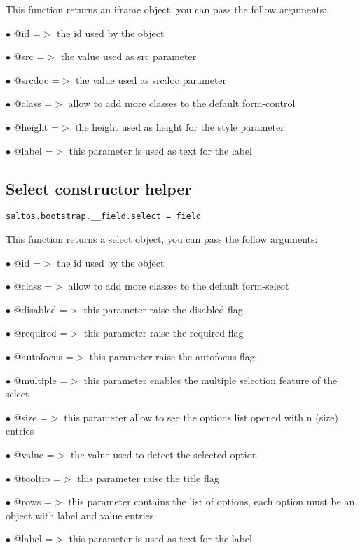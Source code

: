 \documentclass[a4paper]{book}
\begin{document}
This function returns an iframe object, you can pass the follow arguments:

\begin{compactitem}
\item[\color{myblue}$\bullet$] @id     =$>$ the id used by the object
\item[\color{myblue}$\bullet$] @src    =$>$ the value used as src parameter
\item[\color{myblue}$\bullet$] @srcdoc =$>$ the value used as srcdoc parameter
\item[\color{myblue}$\bullet$] @class  =$>$ allow to add more classes to the default form-control
\item[\color{myblue}$\bullet$] @height =$>$ the height used as height for the style parameter
\item[\color{myblue}$\bullet$] @label  =$>$ this parameter is used as text for the label
\end{compactitem}

\hypertarget{toc447}{}
\subsection{Select constructor helper}

\begin{lstlisting}
saltos.bootstrap.__field.select = field
\end{lstlisting}

This function returns a select object, you can pass the follow arguments:

\begin{compactitem}
\item[\color{myblue}$\bullet$] @id        =$>$ the id used by the object
\item[\color{myblue}$\bullet$] @class     =$>$ allow to add more classes to the default form-select
\item[\color{myblue}$\bullet$] @disabled  =$>$ this parameter raise the disabled flag
\item[\color{myblue}$\bullet$] @required  =$>$ this parameter raise the required flag
\item[\color{myblue}$\bullet$] @autofocus =$>$ this parameter raise the autofocus flag
\item[\color{myblue}$\bullet$] @multiple  =$>$ this parameter enables the multiple selection feature of the select
\item[\color{myblue}$\bullet$] @size      =$>$ this parameter allow to see the options list opened with n (size) entries
\item[\color{myblue}$\bullet$] @value     =$>$ the value used to detect the selected option
\item[\color{myblue}$\bullet$] @tooltip   =$>$ this parameter raise the title flag
\item[\color{myblue}$\bullet$] @rows      =$>$ this parameter contains the list of options, each option must be an object
              with label and value entries
\item[\color{myblue}$\bullet$] @label     =$>$ this parameter is used as text for the label
\end{compactitem}
\end{document}
